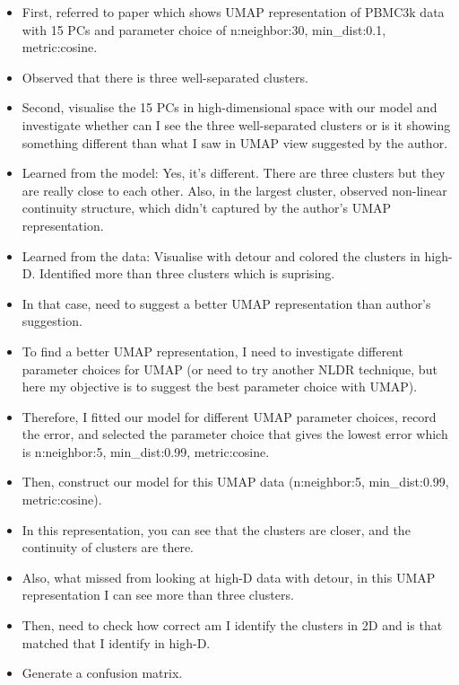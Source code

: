 \documentclass[
  12pt]{article}
\begin{document}
\begin{itemize}
\item
  First, referred to \citet{Chen2023} paper which shows UMAP
  representation of PBMC3k data with 15 PCs and parameter choice of
  n:neighbor:30, min\_dist:0.1, metric:cosine.
\item
  Observed that there is three well-separated clusters.
\item
  Second, visualise the 15 PCs in high-dimensional space with our model
  and investigate whether can I see the three well-separated clusters or
  is it showing something different than what I saw in UMAP view
  suggested by the author.
\item
  Learned from the model: Yes, it's different. There are three clusters
  but they are really close to each other. Also, in the largest cluster,
  observed non-linear continuity structure, which didn't captured by the
  author's UMAP representation.
\item
  Learned from the data: Visualise with detour and colored the clusters
  in high-D. Identified more than three clusters which is suprising.
\item
  In that case, need to suggest a better UMAP representation than
  author's suggestion.
\item
  To find a better UMAP representation, I need to investigate different
  parameter choices for UMAP (or need to try another NLDR technique, but
  here my objective is to suggest the best parameter choice with UMAP).
\item
  Therefore, I fitted our model for different UMAP parameter choices,
  record the error, and selected the parameter choice that gives the
  lowest error which is n:neighbor:5, min\_dist:0.99, metric:cosine.
\item
  Then, construct our model for this UMAP data (n:neighbor:5,
  min\_dist:0.99, metric:cosine).
\item
  In this representation, you can see that the clusters are closer, and
  the continuity of clusters are there.
\item
  Also, what missed from looking at high-D data with detour, in this
  UMAP representation I can see more than three clusters.
\item
  Then, need to check how correct am I identify the clusters in 2D and
  is that matched that I identify in high-D.
\item
  Generate a confusion matrix.
\end{itemize}
\end{document}

